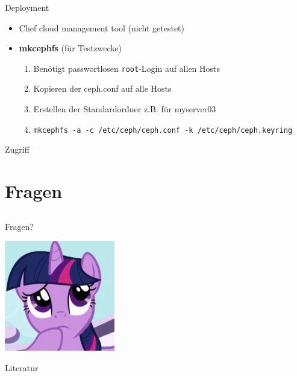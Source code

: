 \documentclass[notes=hide,yellow]{beamer}
\begin{document}
\begin{frame}{Deployment}
	\begin{itemize}
		\item Chef cloud management tool (nicht getestet)
		\item \textbf{mkcephfs} (f\"ur Testzwecke)
			\begin{enumerate}
				\item Ben\"otigt passwortlosen \texttt{root}-Login auf allen Hosts
				\item Kopieren der ceph.conf auf alle Hosts
				\item Erstellen der Standardordner z.B. f\"ur myserver03
				\item \texttt{mkcephfs -a -c /etc/ceph/ceph.conf -k /etc/ceph/ceph.keyring}
			\end{enumerate}
	\end{itemize}
\end{frame}



\begin{frame}{Zugriff}
\end{frame}

\section{Fragen}
\subsection*{}
\begin{frame}
	\begin{center}
	\large Fragen?
	\end{center}
	
	\begin{center}
	\includegraphics[scale=0.8]{questions.jpg}
	\end{center}
\end{frame}



\begin{frame}{Literatur}
	
		
\end{frame}
\end{document}
